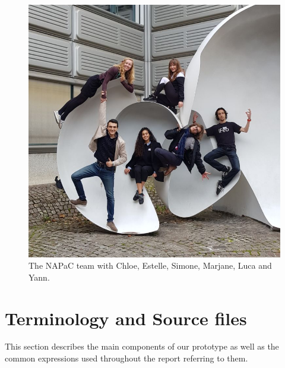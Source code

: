 \vspace{0cm}
\begin{figure}[ht]
    \centering
    \includegraphics[scale=0.24]{images/CHIC.png}
    \caption{The NAPaC team with Chloe, Estelle, Simone, Marjane, Luca and Yann.}
    \label{fig:NAPaC_team}
\end{figure}



\newpage
\section{Terminology and Source files}

This section describes the main components of our prototype as well as the common expressions used throughout the report referring to them.


